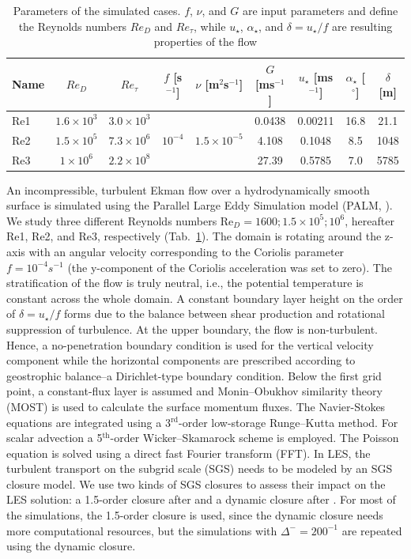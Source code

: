 \documentclass[smallcondensed,draft]{svjour3} %
\providecommand{\DIFaddbeginFL}{} %
\providecommand{\DIFaddendFL}{} %
\newcommand{\DIFaddincludegraphics}[2][]{{\color{blue}\fbox{\DIFOincludegraphics[#1]{#2}}}} %
\DeclareRobustCommand{\DIFaddbeginFL}{\DIFOaddbeginFL \let\includegraphics\DIFaddincludegraphics} %
\DeclareRobustCommand{\DIFaddendFL}{\DIFOaddendFL \let\includegraphics\DIFOincludegraphics} %
\begin{document}
\begin{table}
	\centering
	\caption{Parameters of the simulated cases. $f$, $\nu$, and $G$ are input parameters and define the Reynolds numbers $Re_D$ and $Re_\tau$, while $u_\star$, $\alpha_\star$, and $\delta = u_\star/f$ are resulting properties of the flow}
	\DIFaddbeginFL \begin{adjustbox}{width=\textwidth}
    \DIFaddendFL \begin{tabular}{l|ccccc|ccc}
          \toprule
	  Name & $Re_D$ & $Re_\tau$ & $f$ [s$^{-1}$] & $\nu$ [m$^2$s$^{-1}$] & $G$ [ms$^{-1}$] & $u_\star$ [ms$^{-1}$] & $\alpha_\star$ [$^\circ$]& $\delta$ [m] \\
          \midrule
	  Re1 & $1.6\times10^3$ & $3.0\times10^3$ &  &  & 0.0438 & 0.00211 & 16.8 & 21.1 \\
	  Re2 & $1.5\times10^5$ & $7.3\times10^6$ & $10^{-4}$ & $1.5\times10^{-5}$ & 4.108 & 0.1048 & 8.5 & 1048\\
	  Re3 & $1\times10^6$ & $2.2\times10^8$ &  &  & 27.39 & 0.5785 & 7.0 & 5785 \\
          \bottomrule
	  \end{tabular}
  \DIFaddbeginFL \end{adjustbox}
	\DIFaddendFL \label{simulation_parameters}
\end{table}
An incompressible, turbulent Ekman flow over a hydrodynamically smooth surface is simulated using the Parallel Large Eddy Simulation model (PALM, \citealp{maronga2020overview}). We study three different Reynolds numbers Re$_D = 1600;1.5\times 10^5;10^6$, hereafter Re1, Re2, and Re3, respectively (Tab.~\ref{simulation_parameters}).
%
The domain is rotating around the z-axis with an angular velocity corresponding to the Coriolis parameter $f=10^{-4}s^{-1}$ (the y-component of the Coriolis acceleration was set to zero). The stratification of the flow is truly neutral, i.e., the potential temperature is constant across the whole domain. A constant boundary layer height on the order of $\delta=u_\star/f$ forms due to the balance between shear production and rotational suppression of turbulence. At the upper boundary, the flow is non-turbulent. Hence, a no-penetration boundary condition is used for the vertical velocity component while the horizontal components are prescribed according to geostrophic balance--a Dirichlet-type boundary condition. Below the first grid point, a constant-flux layer is assumed and Monin--Obukhov similarity theory (MOST) is used to calculate the surface momentum fluxes. The Navier-Stokes equations are integrated using a 3$^\text{rd}$-order low-storage Runge--Kutta method. For scalar advection a 5$^\text{th}$-order Wicker--Skamarock scheme is employed. The Poisson equation is solved using a direct fast Fourier transform (FFT). In LES, the turbulent transport on the subgrid scale (SGS) needs to be modeled by an SGS closure model. We use two kinds of SGS closures to assess their impact on the LES solution: a 1.5-order closure after \cite{deardorff1980stratocumulus} and a dynamic closure after \cite{heinz2008realizability}. For most of the simulations, the 1.5-order closure is used, since the dynamic closure needs more computational resources, but the simulations with $\Delta^-=200^{-1}$ are repeated using the dynamic closure.  
\end{document}

